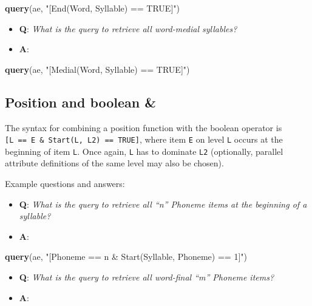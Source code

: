 \documentclass[]{book}
\newenvironment{Shaded}{\begin{snugshade}}{\end{snugshade}}
\newcommand{\KeywordTok}[1]{\textcolor[rgb]{0.13,0.29,0.53}{\textbf{#1}}}
\newcommand{\NormalTok}[1]{#1}
\newcommand{\StringTok}[1]{\textcolor[rgb]{0.31,0.60,0.02}{#1}}
\providecommand{\tightlist}{%
  \setlength{\itemsep}{0pt}\setlength{\parskip}{0pt}}
\theoremstyle{definition}
\theoremstyle{definition}
\theoremstyle{definition}
\theoremstyle{remark}
\begin{document}
\begin{Shaded}
\begin{Highlighting}[]
\KeywordTok{query}\NormalTok{(ae, }\StringTok{"[End(Word, Syllable) == TRUE]"}\NormalTok{)}
\end{Highlighting}
\end{Shaded}

\begin{itemize}
\tightlist
\item
  \textbf{Q}: \emph{What is the query to retrieve all word-medial
  syllables?}
\item
  \textbf{A}:
\end{itemize}

\begin{Shaded}
\begin{Highlighting}[]
\KeywordTok{query}\NormalTok{(ae, }\StringTok{"[Medial(Word, Syllable) == TRUE]"}\NormalTok{)}
\end{Highlighting}
\end{Shaded}

\hypertarget{position-and-boolean}{%
\subsection{Position and boolean \&}\label{position-and-boolean}}

The syntax for combining a position function with the boolean operator
is \texttt{{[}L\ ==\ E\ \&\ Start(L,\ L2)\ ==\ TRUE{]}}, where item
\texttt{E} on level \texttt{L} occurs at the beginning of item
\texttt{L}. Once again, \texttt{L} has to dominate \texttt{L2}
(optionally, parallel attribute definitions of the same level may also
be chosen).

Example questions and answers:

\begin{itemize}
\tightlist
\item
  \textbf{Q}: \emph{What is the query to retrieve all ``n'' Phoneme
  items at the beginning of a syllable?}
\item
  \textbf{A}:
\end{itemize}

\begin{Shaded}
\begin{Highlighting}[]
\KeywordTok{query}\NormalTok{(ae, }\StringTok{"[Phoneme == n & Start(Syllable, Phoneme) == 1]"}\NormalTok{)}
\end{Highlighting}
\end{Shaded}

\begin{itemize}
\tightlist
\item
  \textbf{Q}: \emph{What is the query to retrieve all word-final ``m''
  Phoneme items?}
\item
  \textbf{A}:
\end{itemize}
\end{document}
